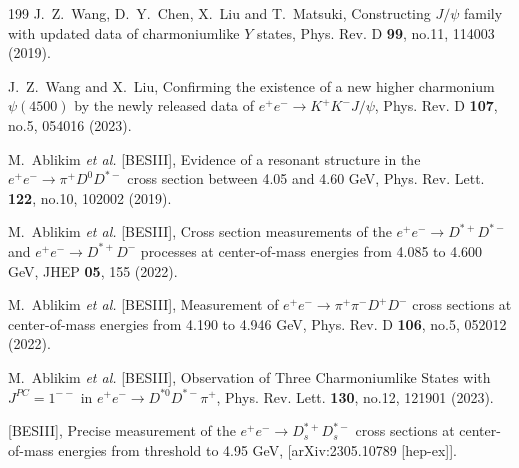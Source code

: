 \documentclass[final,5p,times,twocolumn]{elsarticle}
\begin{document}
\begin{thebibliography}{199}
J.~Z.~Wang, D.~Y.~Chen, X.~Liu and T.~Matsuki,
Constructing $J/\psi$ family with updated data of charmoniumlike $Y$ states,
Phys. Rev. D \textbf{99}, no.11, 114003 (2019).

J.~Z.~Wang and X.~Liu,
Confirming the existence of a new higher charmonium $\psi(4500)$  by the newly released data of $e^+e^- \to K^+K^-J/\psi$,
Phys. Rev. D \textbf{107}, no.5, 054016 (2023).


M.~Ablikim \textit{et al.} [BESIII],
Evidence of a resonant structure in the $e^+e^-\to \pi^+D^0D^{*-}$ cross section between 4.05 and 4.60 GeV,
Phys. Rev. Lett. \textbf{122}, no.10, 102002 (2019).

M.~Ablikim \textit{et al.} [BESIII],
Cross section measurements of the $e^+e^-\to D^{*+}D^{*-}$ and $e^+e^-\to D^{*+}D^{-}$ processes at center-of-mass energies from 4.085 to 4.600 GeV,
JHEP \textbf{05}, 155 (2022).

M.~Ablikim \textit{et al.} [BESIII],
Measurement of $e^{+}e^{-}\rightarrow\pi^{+}\pi^{-}D^{+}D^{-}$ cross sections at center-of-mass energies from 4.190 to 4.946 GeV,
Phys. Rev. D \textbf{106}, no.5, 052012 (2022).

M.~Ablikim \textit{et al.} [BESIII],
Observation of Three Charmoniumlike States with $J^{PC}=1^{--}$ in $e^+e^-\to D^{*0}D^{*-}\pi^+$,
Phys. Rev. Lett. \textbf{130}, no.12, 121901 (2023).

 [BESIII],
Precise measurement of the $e^{+}e^{-}\rightarrow D_{s}^{\ast+}D_{s}^{\ast-}$ cross sections at center-of-mass energies from threshold to 4.95 GeV,
[arXiv:2305.10789 [hep-ex]].



\end{thebibliography}
\end{document}
